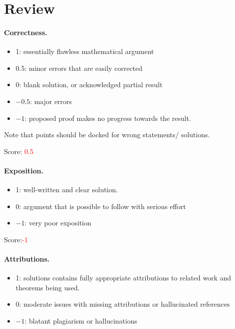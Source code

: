 \documentclass[11pt]{article}
\theoremstyle{remark}
\numberwithin{equation}{section}
\begin{document}
\maketitle

\section{Review}

\paragraph{Correctness.}
\begin{itemize}
	\item  1: essentially flawless mathematical argument
	\item  0.5: minor errors that are easily corrected
	\item  0: blank solution, or acknowledged partial result
	\item  $-0.5$: major errors
	\item  $-1$: proposed proof makes no progress towards the result.
\end{itemize}
Note that points should be docked for wrong statements/ solutions.

\noindent Score: \textcolor{red}{0.5}

\paragraph{Exposition.}
\begin{itemize}
	\item  1: well-written and clear solution.
	\item  0: argument that is possible to follow with serious effort
	\item  $-1$: very poor exposition
\end{itemize}

\noindent Score:\textcolor{red}{-1}

\paragraph{Attributions.}
\begin{itemize}
	\item  1: solutions contains fully appropriate attributions
		to related work and theorems being used.
	\item  0: moderate issues with missing attributions or hallucinated references
	\item  $-1$: blatant plagiarism or hallucinations
\end{itemize}
\end{document}
